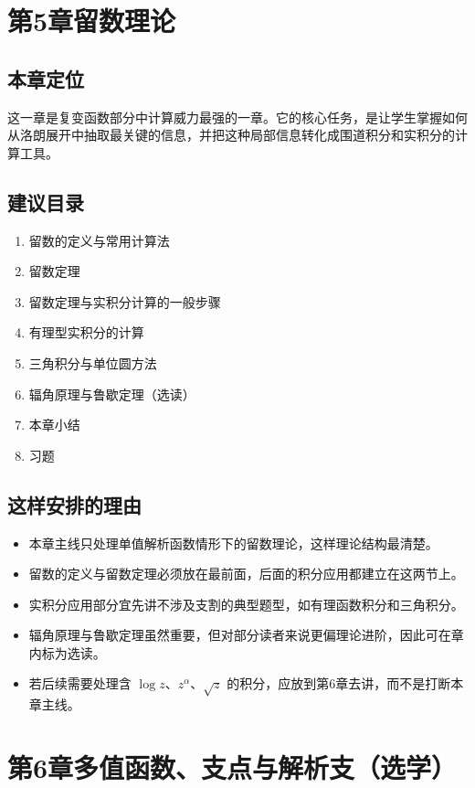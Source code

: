 \section*{第5章\quad 留数理论}

\subsection*{本章定位}
这一章是复变函数部分中计算威力最强的一章。它的核心任务，是让学生掌握如何从洛朗展开中抽取最关键的信息，并把这种局部信息转化成围道积分和实积分的计算工具。

\subsection*{建议目录}
\begin{enumerate}
    \item 留数的定义与常用计算法
    \item 留数定理
    \item 留数定理与实积分计算的一般步骤
    \item 有理型实积分的计算
    \item 三角积分与单位圆方法
    \item 辐角原理与鲁歇定理（选读）
    \item 本章小结
    \item 习题
\end{enumerate}

\subsection*{这样安排的理由}
\begin{itemize}
    \item 本章主线只处理单值解析函数情形下的留数理论，这样理论结构最清楚。
    \item 留数的定义与留数定理必须放在最前面，后面的积分应用都建立在这两节上。
    \item 实积分应用部分宜先讲不涉及支割的典型题型，如有理函数积分和三角积分。
    \item 辐角原理与鲁歇定理虽然重要，但对部分读者来说更偏理论进阶，因此可在章内标为选读。
    \item 若后续需要处理含 $\log z$、$z^\alpha$、$\sqrt{z}$ 的积分，应放到第6章去讲，而不是打断本章主线。
\end{itemize}

\section*{第6章\quad 多值函数、支点与解析支（选学）}

